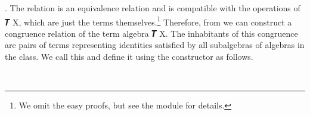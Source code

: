 \documentclass[a4paper,UKenglish,cleveref,autoref,thm-restate]{lipics-v2021}
\begin{document}
\AgdaSpace{}%
\AgdaSpace{}%
\AgdaSpace{}%
\AgdaSpace{}%
\AgdaSymbol{=}\AgdaSpace{}%
\AgdaSpace{}%
\AgdaSpace{}%
\AgdaSymbol{(}\AgdaSpace{}%
\AgdaOperator{\AgdaInductiveConstructor{,}}\AgdaSpace{}%
\AgdaSymbol{)}.
The relation  is an equivalence relation and is compatible with the operations of \af 𝑻 \ab X, which are just the terms themselves.\footnote{We omit the easy proofs, but see the \ualibFreeAlgebra module for details.}  Therefore, from  we can construct a congruence relation of the term algebra \af 𝑻 \ab X. The inhabitants of this congruence are pairs of terms representing identities satisfied by all subalgebras of algebras in the class.  We call this  and define it using the  constructor  as follows.
\ccpad
\begin{code}%
\>[0][@{}l@{\AgdaIndent{1}}]%
\>[1]\AgdaSpace{}%
\AgdaSymbol{:}\AgdaSpace{}%
\AgdaSymbol{(}\AgdaSpace{}%
\AgdaSymbol{:}\AgdaSpace{}%
\AgdaSpace{}%
\AgdaSymbol{(}\AgdaSpace{}%
\AgdaSpace{}%
\AgdaSymbol{)}\AgdaSpace{}%
\AgdaSymbol{)}\AgdaSpace{}%
\AgdaSpace{}%
\AgdaSpace{}%
\AgdaSymbol{(}\AgdaSpace{}%
\AgdaSymbol{)}\<%
\\
%
\>[1]\AgdaSpace{}%
\AgdaSpace{}%
\AgdaSymbol{=}\AgdaSpace{}%
\AgdaSpace{}%
\AgdaSymbol{(}\AgdaSpace{}%
\AgdaSymbol{)}\AgdaSpace{}%
\AgdaSymbol{(}\AgdaSpace{}%
\AgdaSymbol{)}\AgdaSpace{}%
\<%
\end{code}
\end{document}
